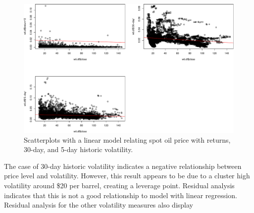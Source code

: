 \documentclass[11pt,]{article}
\begin{document}
\begin{figure}[htbp]
\centering
\includegraphics{Figs/unnamed-chunk-8-1.pdf}
\caption{Scatterplots with a linear model relating spot oil price with
returns, 30-day, and 5-day historic volatility.}
\end{figure}

The case of 30-day historic volatility indicates a negative relationship
between price level and volatility. However, this result appears to be
due to a cluster high volatility around \$20 per barrel, creating a
leverage point. Residual analysis indicates that this is not a good
relationship to model with linear regression. Residual analysis for the
other volatility measures also display
\end{document}
